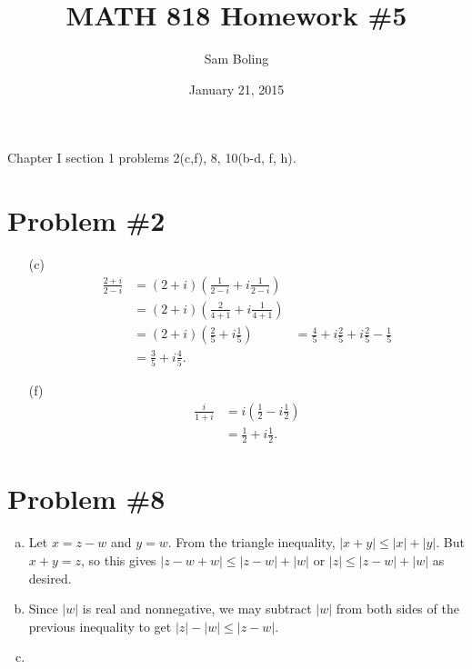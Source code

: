 \documentclass{article}
\title{MATH 818 Homework \#5}
\date{January 21, 2015}
\author{Sam Boling}
\newcounter{Problem}
\begin{document}
\begin{titlepage}
\maketitle
\end{titlepage}

Chapter I section 1 problems 2(c,f), 8, 10(b-d, f, h).

\section*{Problem \#2}
\begin{itemize}
  \item[(c)]{
    \begin{align*}
       \frac{2 + i}{2 - i}
    &= (2+i)\left(\frac{1}{2 - i} + i\frac{1}{2 - i}\right) \\
    &= (2+i)\left(\frac{2}{4+1} + i\frac{1}{4 + 1}\right) \\
    &= (2+i)\left(\frac{2}{5} + i\frac{1}{5}\right)
    &= \frac{4}{5} + i\frac{2}{5} + i\frac{2}{5} - \frac{1}{5} \\
    &= \frac{3}{5} + i\frac{4}{5}.
    \end{align*}
  }
  \item[(f)]{
    \begin{align*}
       \frac{i}{1+i}
    &= i\left(\frac{1}{2} - i\frac{1}{2}\right) \\
    &= \frac{1}{2} + i\frac{1}{2}.
    \end{align*}
  }
\end{itemize}

\section*{Problem \#8}
\begin{enumerate}[(a)]
  \item{
    Let $x = z - w$ and $y = w$. From the triangle inequality,
    $|x + y| \leq |x| + |y|$. But $x + y = z$, so this gives
    $|z - w + w| \leq |z - w| + |w|$ or $|z| \leq |z - w| + |w|$ as
    desired.
  }
  \item{
    Since $|w|$ is real and nonnegative, we may subtract $|w|$ from
    both sides of the previous inequality to get $|z| - |w| \leq |z - w|$.
  }
  \item{
  }
\end{enumerate}
\end{document}
